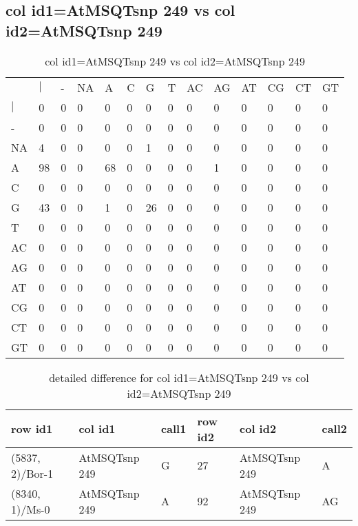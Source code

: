\subsection{col id1=AtMSQTsnp 249 vs col id2=AtMSQTsnp 249}
\begin{center}
\begin{longtable}{|l|l|l|l|l|l|l|l|l|l|l|l|l|l|}
\caption{col id1=AtMSQTsnp 249 vs col id2=AtMSQTsnp 249} \label{table_dm600}\\
\hline
\\
\hline
&$|$&-&NA&A&C&G&T&AC&AG&AT&CG&CT&GT\\
$|$&0&0&0&0&0&0&0&0&0&0&0&0&0\\
-&0&0&0&0&0&0&0&0&0&0&0&0&0\\
NA&4&0&0&0&0&1&0&0&0&0&0&0&0\\
A&98&0&0&68&0&0&0&0&1&0&0&0&0\\
C&0&0&0&0&0&0&0&0&0&0&0&0&0\\
G&43&0&0&1&0&26&0&0&0&0&0&0&0\\
T&0&0&0&0&0&0&0&0&0&0&0&0&0\\
AC&0&0&0&0&0&0&0&0&0&0&0&0&0\\
AG&0&0&0&0&0&0&0&0&0&0&0&0&0\\
AT&0&0&0&0&0&0&0&0&0&0&0&0&0\\
CG&0&0&0&0&0&0&0&0&0&0&0&0&0\\
CT&0&0&0&0&0&0&0&0&0&0&0&0&0\\
GT&0&0&0&0&0&0&0&0&0&0&0&0&0\\
\hline
\end{longtable}
\end{center}

\begin{center}
\begin{longtable}{|l|l|l|l|l|l|}
\caption{detailed difference for col id1=AtMSQTsnp 249 vs col id2=AtMSQTsnp 249} \label{table_dm601}\\
\hline
row id1&col id1&call1&row id2&col id2&call2\\
\hline
(5837, 2)/Bor-1&AtMSQTsnp 249&G&27&AtMSQTsnp 249&A\\
(8340, 1)/Ms-0&AtMSQTsnp 249&A&92&AtMSQTsnp 249&AG\\
\hline
\end{longtable}
\end{center}

